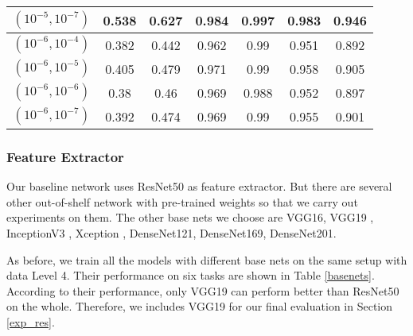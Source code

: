 \begin{table}[]
{\begin{tabular}{|c|c|c|c|c|c|c|}
			$(10^{-5}, 10^{-7})$ & 0.538 & 0.627 & 0.984 & \textbf{0.997} & 0.983 & 0.946 \\ \hline
			$(10^{-6}, 10^{-4})$ & 0.382 & 0.442 & 0.962 & 0.99 & 0.951 & 0.892 \\ \hline
			$(10^{-6}, 10^{-5})$ & 0.405 & 0.479 & 0.971 & 0.99 & 0.958 & 0.905 \\ \hline
			$(10^{-6}, 10^{-6})$ & 0.38 & 0.46 & 0.969 & 0.988 & 0.952 & 0.897 \\ \hline
			$(10^{-6}, 10^{-7})$ & 0.392 & 0.474 & 0.969 & 0.99 & 0.955 & 0.901 \\ \hline
		\end{tabular}%
	}
\end{table}

\subsubsection{Feature Extractor}
Our baseline network uses ResNet50 as feature extractor. But there are several other out-of-shelf network with pre-trained weights so that we carry out experiments on them. The other base nets we choose are VGG16, VGG19 \cite{DBLP:SimonyanZ14a}, InceptionV3 \cite{DBLP:journals/corr/SzegedyVISW15}, Xception \cite{DBLP:journals/corr/Chollet16a}, DenseNet121, DenseNet169, DenseNet201\cite{DBLP:journals/corr/HuangLW16a}.

As before, we train all the models with different base nets on the same setup with data Level 4. Their performance on six tasks are shown in Table \ref{basenets}. According to their performance, only VGG19 can perform better than ResNet50 on the whole. Therefore, we includes VGG19 for our final evaluation in Section \ref{exp_res}.


